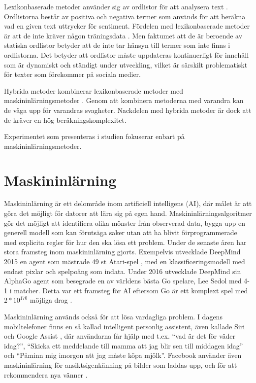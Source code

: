 \documentclass{kaumasters} %
\begin{document}
Lexikonbaserade metoder använder sig av ordlistor för att analysera text \cite{SAsurvey}. Ordlistorna består av positiva och negativa termer som används för att beräkna vad en given text uttrycker för sentiment.
Fördelen med lexikonbaserade metoder är att de inte kräver någon  träningsdata \cite{TSAsurvey}. Men faktumet att de är beroende av statiska ordlistor betyder att de inte tar hänsyn till termer som inte finns i ordlistorna. Det betyder att ordlistor måste uppdateras kontinuerligt för innehåll som är dynamiskt och ständigt under utveckling, vilket är särskilt problematiskt för texter som förekommer på sociala medier. 

Hybrida metoder kombinerar lexikonbaserade metoder med maskininlärningsmetoder \cite{TSAsurvey}. Genom att kombinera metoderna med varandra kan de väga upp för varandras svagheter. Nackdelen med hybrida metoder är dock att de kräver en hög beräkningskomplexitet.

Experimentet som presenteras i studien fokuserar enbart på maskininlärningsmetoder.

\section{Maskininlärning} \label{ML}
Maskininlärning är ett delområde inom artificiell intelligens (AI), där målet är att göra det möjligt för datorer att lära sig på egen hand. Maskininlärningsalgoritmer gör det möjligt att identifiera olika mönster från observerad data, bygga upp en generell modell som kan förutsäga saker utan att ha blivit förprogrammerade med explicita regler för hur den ska lösa ett problem. Under de senaste åren har stora framsteg inom maskininlärning gjorts. Exempelvis utvecklade DeepMind \cite{DMatari00} 2015 en agent som mästrade 49 st Atari-spel \cite{wiki:004}, med en klassificeringsmodell med endast pixlar och spelpoäng som indata. Under 2016 utvecklade DeepMind sin AlphaGo \cite{DMgo} agent som besegrade en av världens bästa Go spelare, Lee Sedol \cite{wiki:005} med 4-1 i matcher. Detta var ett framsteg för AI eftersom Go är ett komplext spel med $2 * 10^{170}$ möjliga drag \cite{wiki:006}.

Maskininlärning används också för att lösa vardagliga problem. I dagens mobiltelefoner finns en så kallad intelligent personlig assistent, även kallade Siri \cite{siri} och Google Assist \cite{google},  där användarna får hjälp med t.ex. “vad är det för väder idag?”, “Skicka ett meddelande till mamma att jag blir sen till middagen idag” och “Påminn mig imorgon att jag måste köpa mjölk”. Facebook använder även maskininlärning för ansiktsigenkänning \cite{facebook:001} på bilder som laddas upp, och för att rekommendera nya vänner \cite{facebook:002}. 
\end{document}
